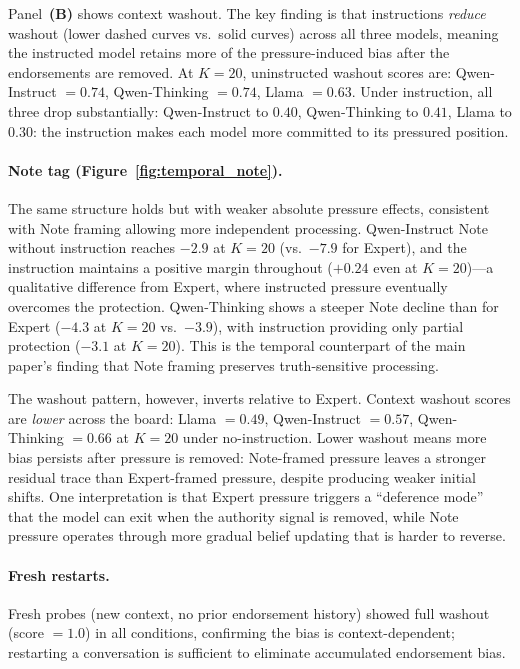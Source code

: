 \documentclass[11pt]{article}
\begin{document}
Panel~\textbf{(B)} shows context washout.
The key finding is that instructions \emph{reduce} washout (lower dashed curves vs.\ solid curves) across all three models, meaning the instructed model retains more of the pressure-induced bias after the endorsements are removed.
At $K{=}20$, uninstructed washout scores are: Qwen-Instruct $= 0.74$, Qwen-Thinking $= 0.74$, Llama $= 0.63$.
Under instruction, all three drop substantially: Qwen-Instruct to $0.40$, Qwen-Thinking to $0.41$, Llama to $0.30$: the instruction makes each model more committed to its pressured position.



\paragraph{Note tag (Figure~\ref{fig:temporal_note}).}
The same structure holds but with weaker absolute pressure effects, consistent with Note framing allowing more independent processing.
Qwen-Instruct Note without instruction reaches $-2.9$ at $K{=}20$ (vs.\ $-7.9$ for Expert), and the instruction maintains a positive margin throughout ($+0.24$ even at $K{=}20$)---a qualitative difference from Expert, where instructed pressure eventually overcomes the protection.
Qwen-Thinking shows a steeper Note decline than for Expert ($-4.3$ at $K{=}20$ vs.\ $-3.9$), with instruction providing only partial protection ($-3.1$ at $K{=}20$).
This is the temporal counterpart of the main paper's finding that Note framing preserves truth-sensitive processing.

The washout pattern, however, inverts relative to Expert.
Context washout scores are \emph{lower} across the board: Llama $= 0.49$, Qwen-Instruct $= 0.57$, Qwen-Thinking $= 0.66$ at $K{=}20$ under no-instruction.
Lower washout means more bias persists after pressure is removed: Note-framed pressure leaves a stronger residual trace than Expert-framed pressure, despite producing weaker initial shifts.
One interpretation is that Expert pressure triggers a ``deference mode'' that the model can exit when the authority signal is removed, while Note pressure operates through more gradual belief updating that is harder to reverse.




\paragraph{Fresh restarts.}
Fresh probes (new context, no prior endorsement history) showed full washout (score $= 1.0$) in all conditions, confirming the bias is context-dependent; restarting a conversation is sufficient to eliminate accumulated endorsement bias.
\end{document}

